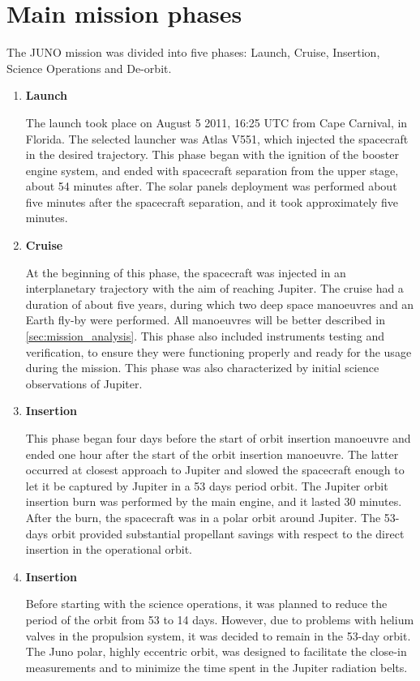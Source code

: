 \section{Main mission phases}
\label{sec:phases}

The JUNO mission was divided into five phases: Launch, Cruise, Insertion, Science Operations and De-orbit.
\begin{enumerate}
    \item \textbf{Launch} 
    

    The launch took place on August 5 2011, 16:25 UTC from Cape Carnival, in Florida. The selected launcher was Atlas V551, which injected the spacecraft in the desired trajectory.
    This phase began with the ignition of the booster engine system, and ended with spacecraft separation from the upper stage, about 54 minutes after. The solar panels deployment was performed about five minutes after the spacecraft separation, and it took approximately five minutes.

    \item \textbf{Cruise}
    
    At the beginning of this phase, the spacecraft was injected in an interplanetary trajectory with the aim of reaching Jupiter. The cruise had a duration of about five years, during which two deep space manoeuvres and an Earth fly-by were performed.
    All manoeuvres will be better described in \autoref{sec:mission_analysis}. This phase also included instruments testing and verification, to ensure they were functioning properly and ready for the usage during the mission. This phase was also characterized by initial science observations of Jupiter.

    \item \textbf{Insertion}
    
    This phase began four days before the start of orbit insertion manoeuvre and ended one hour after the start of the orbit insertion manoeuvre. The latter occurred at closest approach to Jupiter and slowed the spacecraft enough to let it be captured by Jupiter in a 53 days period orbit.
    The Jupiter orbit insertion burn was performed by the main engine, and it lasted 30 minutes. After the burn, the spacecraft was in a polar orbit around Jupiter.
    The 53-days orbit provided substantial propellant savings with respect to the direct insertion in the operational orbit.

    \item \textbf{Insertion}
    
    Before starting with the science operations, it was planned to reduce the period of the orbit from 53 to 14 days.
    However, due to problems with helium valves in the propulsion system, it was decided to remain in the 53-day orbit. The Juno polar, highly eccentric orbit, was designed to facilitate the close-in measurements and to minimize the time spent in the Jupiter radiation belts.


\end{enumerate}
